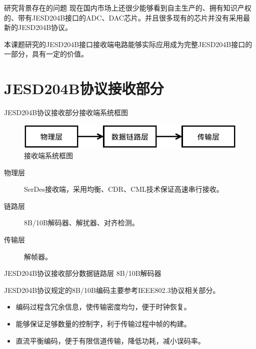 \documentclass{beamer}
\begin{document}
\begin{frame}{研究背景}{存在的问题}
现在国内市场上还很少能够看到自主生产的、拥有知识产权的、带有JESD204B接口的ADC、DAC芯片。并且很多现有的芯片并没有采用最新的JESD204B协议。

本课题研究的JESD204B接口接收端电路能够实际应用成为完整JESD204B接口的一部分，具有一定的价值。
\end{frame}

\section{JESD204B协议接收部分}

\begin{frame}{JESD204B协议接收部分}{接收端系统框图}
	\begin{figure}
	\centering
	\includegraphics[scale=1]{./img/recv_layer.pdf}
	\caption{接收端系统框图}
	\end{figure}
  \begin{description}
  \item [物理层] SerDes接收端，采用均衡、CDR、CML技术保证高速串行接收。
  \item [链路层] 8B/10B解码器、解扰器、对齐检测。
  \item [传输层] 解帧器。
  \end{description}
\end{frame}

\begin{frame}{JESD204B协议接收部分}{数据链路层}
  8B/10B解码器

  JESD204B协议规定的8B/10B编码主要参考IEEE802.3协议相关部分。
  \begin{itemize}
  \item 编码过程含冗余信息，使传输密度均匀，便于时钟恢复。
  \item 能够保证足够数量的控制字，利于传输过程中帧的构建。
  \item 直流平衡编码，便于有限信道传输，降低功耗，减小误码率。
  \end{itemize}
\end{frame}
\end{document}
